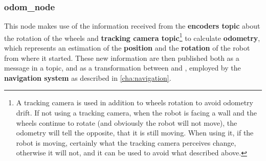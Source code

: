 \subsubsection{odom\_node}

This node makes use of the information received from the \textbf{encoders topic} about the rotation of the wheels and \textbf{tracking camera topic}\footnote{A tracking camera is used in addition to wheels rotation to avoid odometry drift. If not using a tracking camera, when the robot is facing a wall and the wheels continue to rotate (and obviously the robot will not move), the odometry will tell the opposite, that it is still moving. When using it, if the robot is moving, certainly what the tracking camera perceives change, otherwise it will not, and it can be used to avoid what described above.} to calculate \textbf{odometry}, which represents an estimation of the \textbf{position} and the \textbf{rotation} of the robot from where it started. These new information are then published both as a message in a topic, and as a transformation between  and , employed by the \textbf{navigation system} as described in \autoref{cha:navigation}.